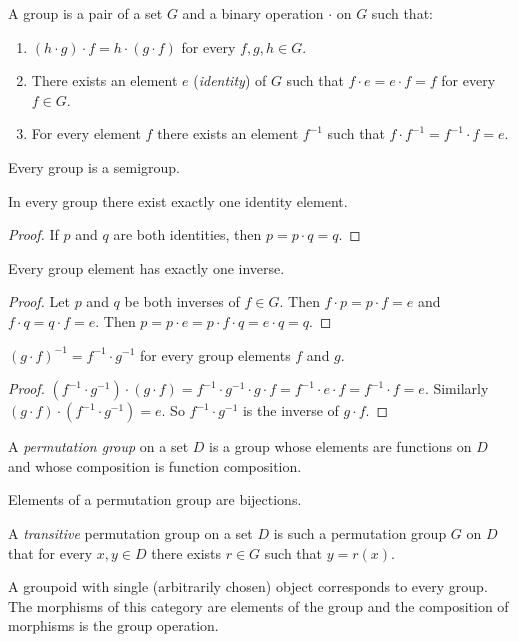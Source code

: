 \begin{defn}
A group is a pair of a set $G$ and a binary operation
$\cdot$ on $G$ such that:
\begin{enumerate}
\item $(h\cdot g)\cdot f=h\cdot(g\cdot f)$ for every $f,g,h\in G$.
\item {}There exists an element $e$ (\emph{identity}) of
$G$ such that $f\cdot e=e\cdot f=f$ for every $f\in G$.
\item For every element $f$ there exists an element $f^{-1}$ such that
$f\cdot f^{-1}=f^{-1}\cdot f=e$.
\end{enumerate}
\end{defn}
\begin{obvious}
Every group is a semigroup.\end{obvious}
\begin{prop}
In every group there exist exactly one identity element.\end{prop}
\begin{proof}
If $p$ and $q$ are both identities, then $p=p\cdot q=q$.\end{proof}
\begin{prop}
Every group element has exactly one inverse.\end{prop}
\begin{proof}
Let $p$ and $q$ be both inverses of $f\in G$. Then $f\cdot p=p\cdot f=e$
and $f\cdot q=q\cdot f=e$. Then $p=p\cdot e=p\cdot f\cdot q=e\cdot q=q$.\end{proof}
\begin{prop}
$(g\cdot f)^{-1}=f^{-1}\cdot g^{-1}$ for every group elements $f$
and $g$.\end{prop}
\begin{proof}
$(f^{-1}\cdot g^{-1})\cdot(g\cdot f)=f^{-1}\cdot g^{-1}\cdot g\cdot f=f^{-1}\cdot e\cdot f=f^{-1}\cdot f=e$.
Similarly $(g\cdot f)\cdot(f^{-1}\cdot g^{-1})=e$. So $f^{-1}\cdot g^{-1}$
is the inverse of $g\cdot f$.\end{proof}
\begin{defn}
A \emph{permutation group} on a set $D$
is a group whose elements are functions on $D$ and whose composition
is function composition.\end{defn}
\begin{obvious}
Elements of a permutation group are bijections.\end{obvious}
\begin{defn}
A \emph{transitive} permutation
group on a set $D$ is such a permutation group $G$ on $D$ that
for every $x,y\in D$ there exists $r\in G$ such that $y=r(x)$.
\end{defn}
A groupoid with single (arbitrarily chosen) object corresponds to
every group. The morphisms of this category are elements of the group
and the composition of morphisms is the group operation.

